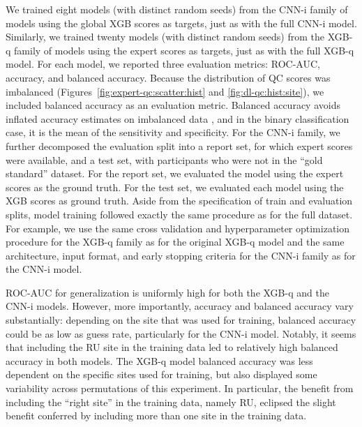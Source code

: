 \documentclass[fleqn,10pt,inline]{wlscirep}
\begin{document}
We trained eight models (with distinct random seeds) from the CNN-i family of models using the global XGB scores as targets, just as with the full CNN-i model. Similarly, we trained twenty models (with distinct random seeds) from the XGB-q family of models using the expert scores as targets, just as with the full XGB-q model. For each model, we reported three evaluation metrics: ROC-AUC, accuracy, and balanced accuracy. Because the distribution of QC scores was imbalanced (Figures~\ref{fig:expert-qc:scatter:hist} and \ref{fig:dl-qc:hist:site}), we included balanced accuracy as an evaluation metric. Balanced accuracy avoids inflated accuracy estimates on imbalanced data \cite{velez2007balanced}, and in the binary classification case, it is the mean of the sensitivity and specificity. For the CNN-i family, we further decomposed the evaluation split into a report set, for which expert scores were available, and a test set, with participants who were not in the ``gold standard'' dataset. For the report set, we evaluated the model using the expert scores as the ground truth. For the test set, we evaluated each model using the XGB scores as ground truth.
Aside from the specification of train and evaluation splits, model training followed exactly the same procedure as for the full dataset. For example, we use the same cross validation and hyperparameter optimization procedure for the XGB-q family as for the original XGB-q model and the same architecture, input format, and early stopping criteria for the CNN-i family as for the CNN-i model.

ROC-AUC for generalization is uniformly high for both the XGB-q and the CNN-i models. However, more importantly, accuracy and balanced accuracy vary substantially: depending on the site that was used for training, balanced accuracy could be as low as guess rate, particularly for the CNN-i model. Notably, it seems that including the RU site in the training data led to relatively high balanced accuracy in both models. The XGB-q model balanced accuracy was less dependent on the specific sites used for training, but also displayed some variability across permutations of this experiment. In particular, the benefit from including the ``right site'' in the training data, namely RU, eclipsed the slight benefit conferred by including more than one site in the training data.
\end{document}
